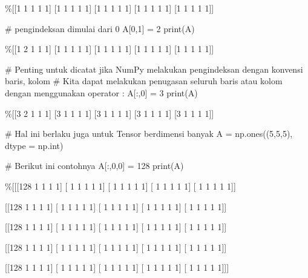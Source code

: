 \begin{pyout}
\%[[1 1 1 1 1]
 [1 1 1 1 1]
 [1 1 1 1 1]
 [1 1 1 1 1]
 [1 1 1 1 1]]
\end{pyout}
\begin{pyin}
# pengindeksan dimulai dari 0
A[0,1] = 2
print(A)
\end{pyin}
\begin{pyout}
\%[[1 2 1 1 1]
 [1 1 1 1 1]
 [1 1 1 1 1]
 [1 1 1 1 1]
 [1 1 1 1 1]]
\end{pyout}
\begin{pyin}
# Penting untuk dicatat jika NumPy melakukan pengindeksan dengan konvensi baris, kolom 
# Kita dapat melakukan penugasan seluruh baris atau kolom dengan menggunakan operator : 
A[:,0] = 3
print(A)
\end{pyin}
\begin{pyout}
\%[[3 2 1 1 1]
 [3 1 1 1 1]
 [3 1 1 1 1]
 [3 1 1 1 1]
 [3 1 1 1 1]]
\end{pyout}
\begin{pyin}
# Hal ini berlaku juga untuk Tensor berdimensi banyak 
A = np.ones((5,5,5), dtype = np.int)

# Berikut ini contohnya
A[:,0,0] = 128
print(A)
\end{pyin}
\begin{pyout}
\%[[[128   1   1   1   1]
  [  1   1   1   1   1]
  [  1   1   1   1   1]
  [  1   1   1   1   1]
  [  1   1   1   1   1]]

 [[128   1   1   1   1]
  [  1   1   1   1   1]
  [  1   1   1   1   1]
  [  1   1   1   1   1]
  [  1   1   1   1   1]]

 [[128   1   1   1   1]
  [  1   1   1   1   1]
  [  1   1   1   1   1]
  [  1   1   1   1   1]
  [  1   1   1   1   1]]

 [[128   1   1   1   1]
  [  1   1   1   1   1]
  [  1   1   1   1   1]
  [  1   1   1   1   1]
  [  1   1   1   1   1]]

 [[128   1   1   1   1]
  [  1   1   1   1   1]
  [  1   1   1   1   1]
  [  1   1   1   1   1]
  [  1   1   1   1   1]]]
\end{pyout}
